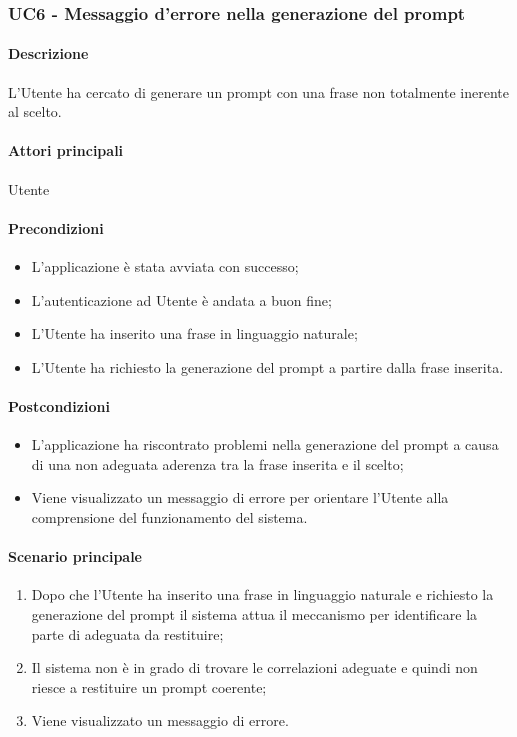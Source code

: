 \subsubsection{UC6 - Messaggio d'errore nella generazione del prompt}\label{UC6}
\paragraph*{Descrizione}
L’Utente ha cercato di generare un prompt con una frase non totalmente inerente al  scelto.

\paragraph*{Attori principali}
Utente

\paragraph*{Precondizioni}
\begin{itemize}
  \item L'applicazione è stata avviata con successo;
  \item L’autenticazione ad Utente è andata a buon fine;
  \item L’Utente ha inserito una frase in linguaggio naturale;
  \item L’Utente ha richiesto la generazione del prompt a partire dalla frase inserita.  
\end{itemize}

\paragraph*{Postcondizioni}
\begin{itemize}
  \item L’applicazione ha riscontrato problemi nella generazione del prompt a causa di una non adeguata aderenza tra la frase inserita e il  scelto;
  \item Viene visualizzato un messaggio di errore per orientare l’Utente alla comprensione del funzionamento del sistema.
\end{itemize}

\paragraph*{Scenario principale}
\begin{enumerate}
  \item Dopo che l’Utente ha inserito una frase in linguaggio naturale e richiesto la generazione del prompt il sistema attua il meccanismo per identificare la parte di  adeguata da restituire;
  \item Il sistema non è in grado di trovare le correlazioni adeguate e quindi non riesce a restituire un prompt coerente;
  \item Viene visualizzato un messaggio di errore.  
\end{enumerate}
